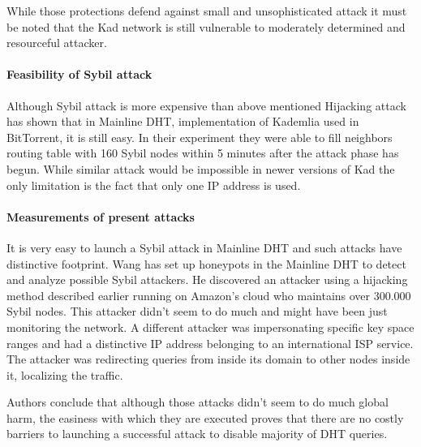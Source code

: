 While those protections defend against small and unsophisticated attack it must
be noted that the Kad network is still vulnerable to moderately determined and
resourceful attacker.

\paragraph{Feasibility of Sybil attack}
Although Sybil attack is more expensive than above mentioned Hijacking attack
\cite{tim11} has shown that in Mainline DHT, implementation of Kademlia used in
BitTorrent, it is still easy. In their experiment they were able to fill
neighbors routing table with 160 Sybil nodes within 5 minutes after the attack
phase has begun. While similar attack would be impossible in newer versions of
Kad the only limitation is the fact that only one IP address is used.

\paragraph{Measurements of present attacks}
It is very easy to launch a Sybil attack in Mainline DHT and such attacks have
distinctive footprint. Wang \cite{wan12a} has set up honeypots in the Mainline
DHT to detect and analyze possible Sybil attackers. He discovered an attacker
using a hijacking method described earlier running on Amazon's cloud who
maintains over 300.000 Sybil nodes. This attacker didn't seem to do much
and might have been just monitoring the network. A different attacker was
impersonating specific key space ranges and had a distinctive IP address
belonging to an international ISP service.
The attacker was redirecting queries from inside its domain
to other nodes inside it, localizing the traffic.

Authors conclude that although those attacks didn't seem to do much global harm,
the easiness with which they are executed proves that there are no costly
barriers to launching a successful attack to disable majority of DHT queries.
